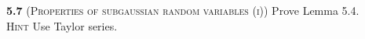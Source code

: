 

















\noindent\textbf{5.7}
(\textsc{Properties of subgaussian random variables (i)}) Prove Lemma 5.4. \\\textsc{Hint} Use Taylor series.

